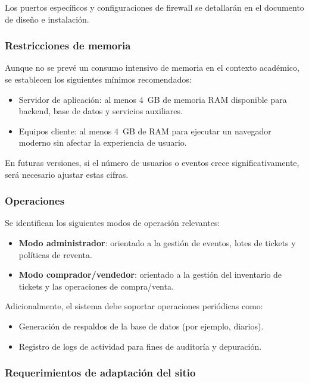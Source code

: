 \documentclass[12pt,letterpaper]{article}
\begin{document}
Los puertos específicos y configuraciones de firewall se detallarán en el
documento de diseño e instalación.

\subsubsection{Restricciones de memoria}

Aunque no se prevé un consumo intensivo de memoria en el contexto académico, se
establecen los siguientes mínimos recomendados:

\begin{itemize}
    \item Servidor de aplicación: al menos 4~GB de memoria RAM disponible para
          backend, base de datos y servicios auxiliares.
    \item Equipos cliente: al menos 4~GB de RAM para ejecutar un navegador
          moderno sin afectar la experiencia de usuario.
\end{itemize}

En futuras versiones, si el número de usuarios o eventos crece
significativamente, será necesario ajustar estas cifras.

\subsubsection{Operaciones}

Se identifican los siguientes modos de operación relevantes:

\begin{itemize}
    \item \textbf{Modo administrador}: orientado a la gestión de eventos, lotes
          de tickets y políticas de reventa.
    \item \textbf{Modo comprador/vendedor}: orientado a la gestión del
          inventario de tickets y las operaciones de compra/venta.
\end{itemize}

Adicionalmente, el sistema debe soportar operaciones periódicas como:

\begin{itemize}
    \item Generación de respaldos de la base de datos (por ejemplo, diarios).
    \item Registro de logs de actividad para fines de auditoría y depuración.
\end{itemize}

\subsubsection{Requerimientos de adaptación del sitio}
\end{document}
